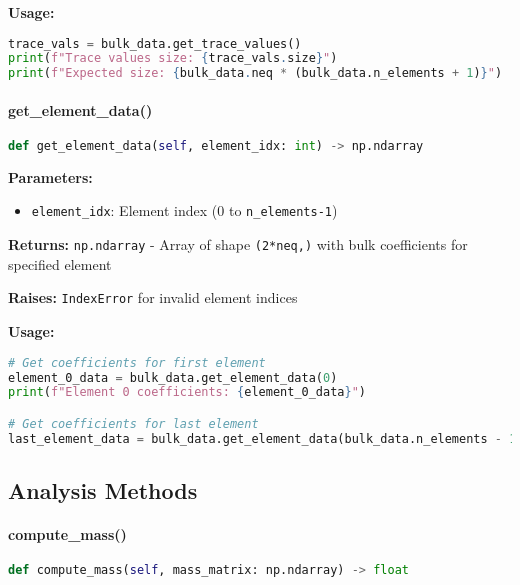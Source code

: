 \textbf{Usage:}
\begin{lstlisting}[language=Python, caption=Get Trace Values Usage]
trace_vals = bulk_data.get_trace_values()
print(f"Trace values size: {trace_vals.size}")
print(f"Expected size: {bulk_data.neq * (bulk_data.n_elements + 1)}")
\end{lstlisting}

\paragraph{get\_element\_data()}\leavevmode
\begin{lstlisting}[language=Python, caption=Get Element Data Method]
def get_element_data(self, element_idx: int) -> np.ndarray
\end{lstlisting}

\textbf{Parameters:}
\begin{itemize}
    \item \texttt{element\_idx}: Element index (0 to \texttt{n\_elements-1})
\end{itemize}

\textbf{Returns:} \texttt{np.ndarray} - Array of shape \texttt{(2*neq,)} with bulk coefficients for specified element

\textbf{Raises:} \texttt{IndexError} for invalid element indices

\textbf{Usage:}
\begin{lstlisting}[language=Python, caption=Element Data Usage]
# Get coefficients for first element
element_0_data = bulk_data.get_element_data(0)
print(f"Element 0 coefficients: {element_0_data}")

# Get coefficients for last element
last_element_data = bulk_data.get_element_data(bulk_data.n_elements - 1)
\end{lstlisting}

\subsection{Analysis Methods}
\label{subsec:analysis_methods}

\paragraph{compute\_mass()}\leavevmode
\begin{lstlisting}[language=Python, caption=Compute Mass Method]
def compute_mass(self, mass_matrix: np.ndarray) -> float
\end{lstlisting}

